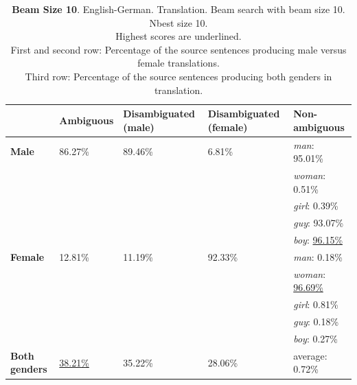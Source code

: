 \begin{table}[!htb]

    \begin{subtable}{\textwidth}
        \centering
        \begin{tabularx}{\linewidth}{|X|XXXX|}
            \hline
             & \textbf{Ambiguous} & \textbf{Disambiguated (male)} & \textbf{Disambiguated (female)} & \textbf{Non-ambiguous} \\ \hline
             \textbf{Male} & 86.27\% & 89.46\% & 6.81\% & \textit{man}: 95.01\% \\
             &&&& \textit{woman}: 0.51\% \\
             &&&& \textit{girl}: 0.39\% \\
             &&&& \textit{guy}: 93.07\% \\
             &&&& \textit{boy}: \underline{96.15\%} \\ \hline
             \textbf{Female} & 12.81\% & 11.19\% & 92.33\% & \textit{man}: 0.18\% \\ 
             &&&& \textit{woman}: \underline{96.69\%} \\
             &&&& \textit{girl}: 0.81\% \\
             &&&& \textit{guy}: 0.18\% \\
             &&&& \textit{boy}: 0.27\% \\\hline
             \textbf{Both genders} & \underline{38.21\%} & 35.22\% & 28.06\% & average: 0.72\% \\ \hline
        \end{tabularx}
        \caption{\textbf{Beam Size 10}. English-German. Translation. Beam search with beam size 10. Nbest size 10. \\ Highest scores are underlined. \\ First and second row: Percentage of the source sentences producing male versus female translations. \\ Third row: Percentage of the source sentences producing both genders in translation.}
        \label{tab:gender_percent_10}
    \end{subtable}


\end{table}
